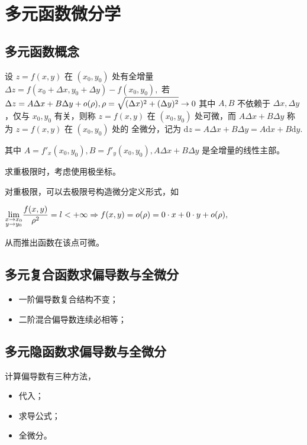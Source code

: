 \chapter{多元函数微分学}

\section{多元函数概念}


设 $ z = f(x,y) $ 在 $ (x_0,y_0) $ 处有全增量 
$ \Delta z = f(x_0+\Delta x,y_0 + \Delta y) - f(x_0,y_0), $ 
若 $ \Delta z = A\Delta x + B\Delta y + o(\rho),\rho = \displaystyle\sqrt{(\Delta x)^2+(\Delta y)^2}\rightarrow0 $ 
其中 $ A,B $ 不依赖于 $ \Delta x,\Delta y $ ，仅与 $ x_0,y_0 $ 有关，则称 $ z = f(x,y) $ 
在 $ (x_0,y_0) $ 处可微，而 $ A\Delta x+B\Delta y $ 称为 $ z = f(x,y) $ 在 $ (x_0,y_0) $ 处的
全微分，记为 $ \mathrm{d}z = A\Delta x + B\Delta y = A\mathrm{d}x + B\mathrm{d}y. $ 

其中 $ A = f'_x(x_0,y_0), B = f'_y(x_0,y_0), A\Delta x + B\Delta y $ 是全增量的线性主部。

求重极限时，考虑使用极坐标。


对重极限，可以去极限号构造微分定义形式，如

$ \displaystyle {\displaystyle\lim_{\begin{subarray}{c}x\rightarrow x_0\\y\rightarrow y_0\end{subarray}}} 
\dfrac{f(x,y)}{\rho^2} = l < +\infty \Rightarrow f(x,y) = o(\rho) = 0\cdot x + 0\cdot y + o(\rho), $  

从而推出函数在该点可微。

\section{多元复合函数求偏导数与全微分}

\begin{itemize}
    \item 一阶偏导数复合结构不变；
    \item 二阶混合偏导数连续必相等；
\end{itemize}

\section{多元隐函数求偏导数与全微分}

计算偏导数有三种方法，
\begin{itemize}
    \item 代入；
    \item 求导公式；
    \item 全微分。
\end{itemize}

